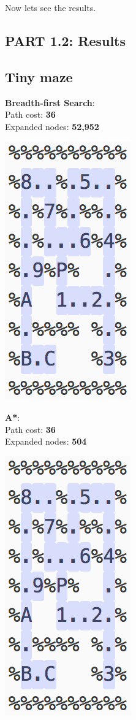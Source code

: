\documentclass[11pt]{article}
\begin{document}
Now lets see the results.
\pagebreak

\subsection*{PART 1.2: Results}

\subsection*{Tiny maze}
\textbf{Breadth-first Search}:\\
Path cost: \textbf{36}\\
Expanded nodes: \textbf{52,952}
\begin{center}
\includegraphics[scale=.9]{tiny-pacman/bfs.png}
\end{center}


\textbf{A*}:\\
Path cost: \textbf{36}\\
Expanded nodes: \textbf{504}
\begin{center}
\includegraphics[scale=.9]{tiny-pacman/a-star.png}
\end{center}
\pagebreak
\end{document}
